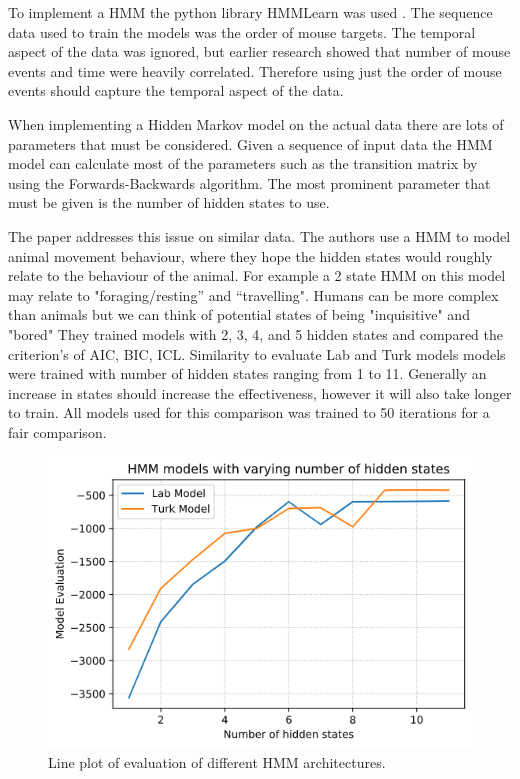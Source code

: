 \documentclass{article}
\begin{document}
To implement a HMM the python library HMMLearn was used \cite{hmmlearn}.
The sequence data used to train the models was the order of mouse targets.
The temporal aspect of the data was ignored, but earlier research showed that number of mouse events and time were heavily correlated.
Therefore using just the order of mouse events should capture the temporal aspect of the data.

When implementing a Hidden Markov model on the actual data there are lots of parameters that must be considered. 
Given a sequence of input data the HMM model can calculate most of the parameters such as the transition matrix by using the Forwards-Backwards algorithm.
The most prominent parameter that must be given is the number of hidden states to use.

The paper \cite{pohle2017selecting} addresses this issue on similar data.
The authors use a HMM to model animal movement behaviour, where they hope the hidden states would roughly relate to the behaviour of the animal.
For example a 2 state HMM on this model may relate to "foraging/resting” and “travelling".
Humans can be more complex than animals but we can think of potential states of being "inquisitive" and "bored"
They trained models with 2, 3, 4, and 5 hidden states and compared the criterion's of AIC, BIC, ICL.
Similarity to evaluate Lab and Turk models models were trained with number of hidden states ranging from 1 to 11.
Generally an increase in states should increase the effectiveness, however it will also take longer to train.
All models used for this comparison was trained to 50 iterations for a fair comparison. 

\begin{figure}[ht]
    \centering
    \includegraphics[scale=0.55]{Images/ModelEvaluation.png}
    \caption{Line plot of evaluation of different HMM architectures.}
    \label{fig:ModleEval}
\end{figure}
\end{document}
